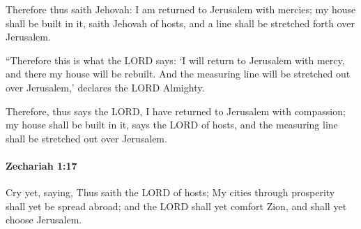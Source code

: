 			\begin{versebox}
					\item[BHS] 
					\item[LXX] 
					\item[ASV] Therefore thus saith Jehovah: I am returned to Jerusalem with mercies; my house shall be built in it, saith Jehovah of hosts, and a line shall be stretched forth over Jerusalem.
					\item[NIV] “Therefore this is what the LORD says: ‘I will return to Jerusalem with mercy, and there my house will be rebuilt. And the measuring line will be stretched out over Jerusalem,’ declares the LORD Almighty.
					\item[NRSV] Therefore, thus says the LORD, I have returned to Jerusalem with compassion; my house shall be built in it, says the LORD of hosts, and the measuring line shall be stretched out over Jerusalem.
			\end{versebox}

		\paragraph{Zechariah 1:17} %
			\label{ZECHARIAH-1-17}

			Cry yet, saying, Thus saith the LORD of hosts; My cities through prosperity shall yet be spread abroad; and the LORD shall yet comfort Zion, and shall yet choose Jerusalem.

